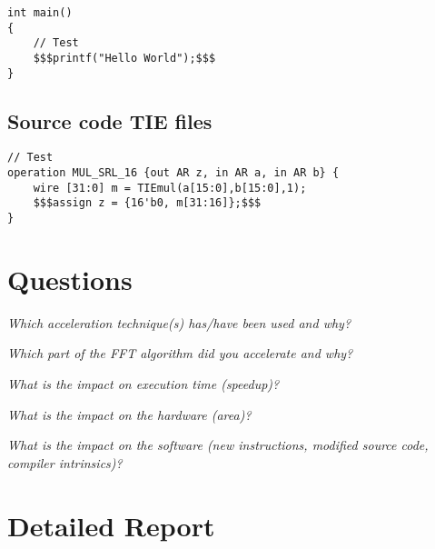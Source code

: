 \documentclass{tudscrreprt}
\newcommand{\question}[1]{\noindent\textit{#1}\\}
\newcommand{\answer}[1]{\vspace{-1.5em}\begin{oframed}#1\end{oframed}}
\begin{document}
\begin{lstlisting}
int main()
{
    // Test
    $$$printf("Hello World");$$$
}
\end{lstlisting}

\section*{Source code TIE files}

\begin{lstlisting}[style=tie]
// Test
operation MUL_SRL_16 {out AR z, in AR a, in AR b} {
    wire [31:0] m = TIEmul(a[15:0],b[15:0],1);
    $$$assign z = {16'b0, m[31:16]};$$$
}
\end{lstlisting}

\chapter*{Questions}

\question{Which acceleration technique(s) has/have been used and why?}
\answer{
}

\question{Which part of the FFT algorithm did you accelerate and why?}
\answer{
}

\question{What is the impact on execution time (speedup)?}
\answer{
}

\question{What is the impact on the hardware (area)?}
\answer{
}

\question{What is the impact on the software (new instructions, modified source
code, compiler intrinsics)?}
\answer{
}

\chapter*{Detailed Report}
\end{document}
